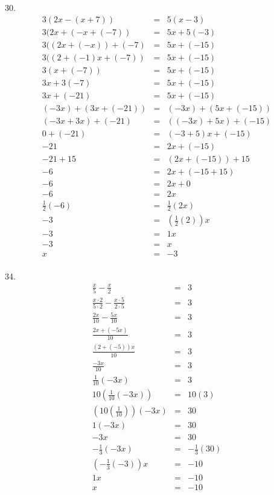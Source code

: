 \documentclass[letterpaper]{article}
\begin{document}
30.
\begin{eqnarray*}
3(2x-(x+7)) &=& 5(x-3) \\
3(2x+(-x+(-7)) &=& 5x+5(-3) \\
3((2x+(-x))+(-7) &=& 5x+(-15) \\
3((2+(-1)x+(-7)) &=& 5x+(-15) \\
3(x+(-7)) &=& 5x+(-15) \\
3x+3(-7) &=& 5x+(-15) \\
3x+(-21) &=& 5x+(-15) \\
(-3x)+(3x+(-21)) &=& (-3x)+(5x+(-15)) \\
(-3x+3x)+(-21) &=& ((-3x)+5x)+(-15) \\
0+(-21) &=& (-3+5)x+(-15) \\
-21 &=& 2x+(-15) \\
-21+15 &=& (2x+(-15))+15 \\
-6 &=& 2x+(-15+15) \\
-6 &=& 2x+0 \\
-6 &=& 2x \\
\frac{1}{2}(-6) &=& \frac{1}{2}(2x) \\
-3 &=& (\frac{1}{2}(2))x \\
-3 &=& 1x \\
-3 &=& x \\
x &=& -3 \\
\end{eqnarray*}

34.
\begin{eqnarray*}
\frac{x}{5}-\frac{x}{2} &=& 3 \\
\frac{x\cdot2}{5\cdot2}-\frac{x\cdot5}{2\cdot5} &=& 3 \\
\frac{2x}{10}-\frac{5x}{10} &=& 3 \\
\frac{2x+(-5x)}{10} &=& 3 \\
\frac{(2+(-5))x}{10} &=& 3 \\
\frac{-3x}{10} &=& 3 \\
\frac{1}{10}(-3x) &=& 3 \\
10(\frac{1}{10}(-3x)) &=& 10(3) \\
(10(\frac{1}{10}))(-3x) &=& 30 \\
1(-3x) &=& 30 \\
-3x &=& 30 \\
-\frac{1}{3}(-3x) &=& -\frac{1}{3}(30) \\
(-\frac{1}{3}(-3))x &=& -10 \\
1x &=& -10 \\
x &=& -10 \\
\end{eqnarray*}
\end{document}
